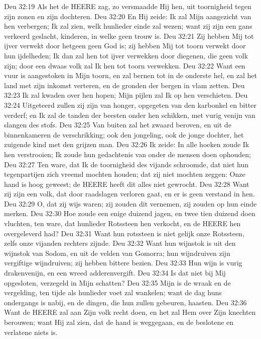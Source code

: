Deu 32:19  Als het de HEERE zag, zo versmaadde Hij hen, uit toornigheid tegen zijn zonen en zijn dochteren.
Deu 32:20  En Hij zeide: Ik zal Mijn aangezicht van hen verbergen; Ik zal zien, welk hunlieder einde zal wezen; want zij zijn een gans verkeerd geslacht, kinderen, in welke geen trouw is.
Deu 32:21  Zij hebben Mij tot ijver verwekt door hetgeen geen God is; zij hebben Mij tot toorn verwekt door hun ijdelheden; Ik dan zal hen tot ijver verwekken door diegenen, die geen volk zijn; door een dwaas volk zal Ik hen tot toorn verwekken.
Deu 32:22  Want een vuur is aangestoken in Mijn toorn, en zal bernen tot in de onderste hel, en zal het land met zijn inkomst verteren, en de gronden der bergen in vlam zetten.
Deu 32:23  Ik zal kwaden over hen hopen; Mijn pijlen zal Ik op hen verschieten.
Deu 32:24  Uitgeteerd zullen zij zijn van honger, opgegeten van den karbonkel en bitter verderf; en Ik zal de tanden der beesten onder hen schikken, met vurig venijn van slangen des stofs.
Deu 32:25  Van buiten zal het zwaard beroven, en uit de binnenkameren de verschrikking; ook den jongeling, ook de jonge dochter, het zuigende kind met den grijzen man.
Deu 32:26  Ik zeide: In alle hoeken zoude Ik hen verstrooien; Ik zoude hun gedachtenis van onder de mensen doen ophouden;
Deu 32:27  Ten ware, dat Ik de toornigheid des vijands schroomde, dat niet hun tegenpartijen zich vreemd mochten houden; dat zij niet mochten zeggen: Onze hand is hoog geweest; de HEERE heeft dit alles niet gewrocht.
Deu 32:28  Want zij zijn een volk, dat door raadslagen verloren gaat, en er is geen verstand in hen.
Deu 32:29  O, dat zij wijs waren; zij zouden dit vernemen, zij zouden op hun einde merken.
Deu 32:30  Hoe zoude een enige duizend jagen, en twee tien duizend doen vluchten, ten ware, dat hunlieder Rotssteen hen verkocht, en de HEERE hen overgeleverd had?
Deu 32:31  Want hun rotssteen is niet gelijk onze Rotssteen, zelfs onze vijanden rechters zijnde.
Deu 32:32  Want hun wijnstok is uit den wijnstok van Sodom, en uit de velden van Gomorra; hun wijndruiven zijn vergiftige wijndruiven; zij hebben bittere bezien.
Deu 32:33  Hun wijn is vurig drakenvenijn, en een wreed adderenvergift.
Deu 32:34  Is dat niet bij Mij opgesloten, verzegeld in Mijn schatten?
Deu 32:35  Mijn is de wraak en de vergelding, ten tijde als hunlieder voet zal wankelen; want de dag huns ondergangs is nabij, en de dingen, die hun zullen gebeuren, haasten.
Deu 32:36  Want de HEERE zal aan Zijn volk recht doen, en het zal Hem over Zijn knechten berouwen; want Hij zal zien, dat de hand is weggegaan, en de beslotene en verlatene niets is.

